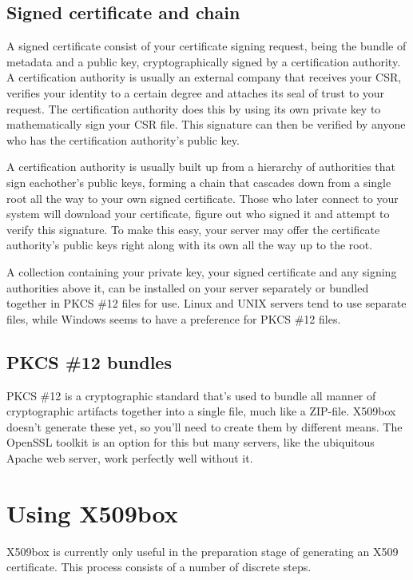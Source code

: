 \documentclass[a4paper,12pt]{article}
\begin{document}
\subsection{Signed certificate and chain}
A signed certificate consist of your certificate signing request, being the bundle of metadata and a public key, cryptographically signed by a certification authority. A certification authority is usually an external company that receives your CSR, verifies your identity to a certain degree and attaches its seal of trust to your request. The certification authority does this by using its own private key to mathematically sign your CSR file. This signature can then be verified by anyone who has the certification authority's public key.

A certification authority is usually built up from a hierarchy of authorities that sign eachother's public keys, forming a chain that cascades down from a single root all the way to your own signed certificate. Those who later connect to your system will download your certificate, figure out who signed it and attempt to verify this signature. To make this easy, your server may offer the certificate authority's public keys right along with its own all the way up to the root.

A collection containing your private key, your signed certificate and any signing authorities above it, can be installed on your server separately or bundled together in PKCS \#12 files for use. Linux and UNIX servers tend to use separate files, while Windows seems to have a preference for PKCS \#12 files.

\subsection{PKCS \#12 bundles}
PKCS \#12 is a cryptographic standard that's used to bundle all manner of cryptographic artifacts together into a single file, much like a ZIP-file. X509box doesn't generate these yet, so you'll need to create them by different means. The OpenSSL toolkit is an option for this but many servers, like the ubiquitous Apache web server, work perfectly well without it.

\section{Using X509box}
X509box is currently only useful in the preparation stage of generating an X509 certificate. This process consists of a number of discrete steps.
\end{document}

